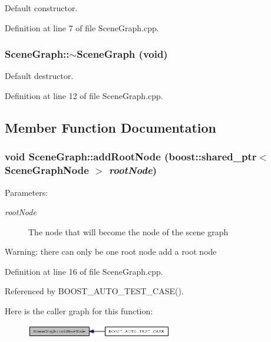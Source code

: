 Default constructor. 



Definition at line 7 of file SceneGraph.cpp.
\subsubsection{\setlength{\rightskip}{0pt plus 5cm}SceneGraph::$\sim$SceneGraph (void)}\label{classSceneGraph_9de03f60b86e0ab36a52e9393c8bec01}


Default destructor. 



Definition at line 12 of file SceneGraph.cpp.

\subsection{Member Function Documentation}
\subsubsection{\setlength{\rightskip}{0pt plus 5cm}void SceneGraph::addRootNode (boost::shared\_\-ptr$<$ {\bf SceneGraphNode} $>$ {\em rootNode})}\label{classSceneGraph_e6eeea8a739aedc54d8afc8b422766e9}


\begin{Desc}
\item[Parameters:]
\begin{description}
\item[{\em rootNode}]The node that will become the node of the scene graph \end{description}
\end{Desc}


\begin{Desc}
\item[Warning:]there can only be one root node add a root node \end{Desc}


Definition at line 16 of file SceneGraph.cpp.

Referenced by BOOST\_\-AUTO\_\-TEST\_\-CASE().

Here is the caller graph for this function:\nopagebreak
\begin{figure}[H]
\begin{center}
\leavevmode
\includegraphics[width=180pt]{classSceneGraph_e6eeea8a739aedc54d8afc8b422766e9_icgraph}
\end{center}
\end{figure}
